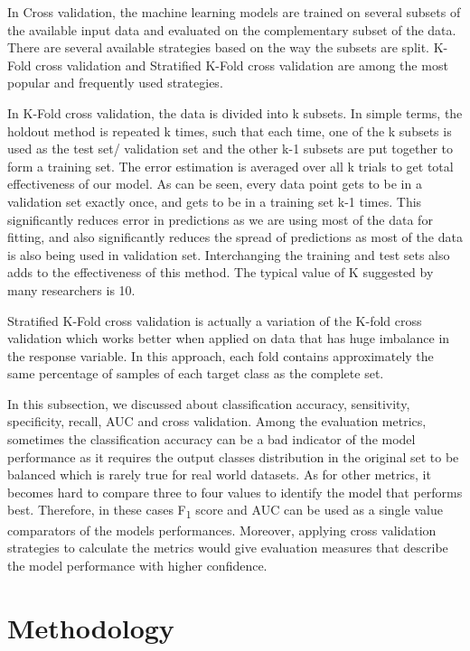 \documentclass[11pt,openright]{report}
\begin{document}
In Cross validation, the machine learning models are trained on several subsets of the available input data and evaluated on the complementary subset of the data. There are several available strategies based on the way the subsets are split. K-Fold cross validation and Stratified K-Fold cross validation are among the most popular and frequently used strategies.

In K-Fold cross validation, the data is divided into k subsets. In simple terms, the holdout method is repeated k times, such that each time, one of the k subsets is used as the test set/ validation set and the other k-1 subsets are put together to form a training set. The error estimation is averaged over all k trials to get total effectiveness of our model. As can be seen, every data point gets to be in a validation set exactly once, and gets to be in a training set k-1 times. This significantly reduces error in predictions as we are using most of the data for fitting, and also significantly reduces the spread of predictions as most of the data is also being used in validation set. Interchanging the training and test sets also adds to the effectiveness of this method. The typical value of K suggested by many researchers is 10.

Stratified K-Fold cross validation is actually a variation of the K-fold cross validation which works better when applied on data that has huge imbalance in the response variable. In this approach, each fold contains approximately the same percentage of samples of each target class as the complete set.\newline

\noindent In this subsection, we discussed about classification accuracy, sensitivity, specificity, recall, AUC and cross validation. Among the evaluation metrics, sometimes the classification accuracy can be a bad indicator of the model performance as it requires the output classes distribution in the original set to be balanced which is rarely true for real world datasets. As for other metrics, it becomes hard to compare three to four values to identify the model that performs best. Therefore, in these cases F\textsubscript1 score and AUC can be used as a single value comparators of the models performances. Moreover, applying cross validation strategies to calculate the metrics would give evaluation measures that describe the model performance with higher confidence.


\chapter{Methodology} \label{chapter:methodology}
\end{document}
